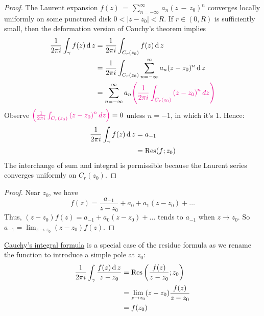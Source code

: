 \documentclass[12pt]{article}
\renewcommand{\d}{\ensuremath{\operatorname{d}}}
\begin{document}
\begin{proof}
    The Laurent expansion $f(z)\,=\,\sum_{n=-\infty}^{\infty}\,a_{n}(z\,-\,z_{0})^{n}$ converges locally uniformly on some punctured disk $0 < |z - z_0| < R$. If $r \in (0, R)$ is sufficiently small, then the deformation version of Cauchy's theorem implies \begin{align*}
        \frac{1}{2\pi i}\int_{\gamma}f(z)\d z&=\frac{1}{2\pi i}\int_{C_{r}(z_{0})}f(z)\d z\\
        &=\frac{1}{2\pi i}\int_{C_{r}(z_{0})}\sum_{n=-\infty}^{\infty}a_{n}(z-z_{0})^{n}\d z\\
        &= \sum_{n=-\infty}^{\infty}a_{n}\rt{\left(\frac{1}{2\pi i}\int_{C_{r}(z_{0})}^{}\left(z-z_{0}\right)^{n}d z\right)}
    \end{align*}
    Observe \(\textcolor{magenta}{\left(\frac{1}{2\pi i}\int_{C_{r}(z_{0})}^{}\left(z-z_{0}\right)^{n}d z\right)}=0\) unless $n=-1$, in which it's 1. Hence:
    \begin{align*}
        \frac{1}{2\pi i}\int_{\gamma}f(z)\d z&= a_{-1}\\
        &=\Res(f;z_0)
    \end{align*}
    The interchange of sum and integral is permissible because the Laurent series converges uniformly on $C_{r}(z_0)$.
\end{proof}

\begin{proof}
    Near $z_0$, we have \[f(z) = \frac{a_{-1}}{z-z_0}+a_0+a_1(z-z_0)+\dots\]
    Thus, $(z-z_0)f(z)=a_{-1}+a_0(z-z_0)+\dots$ tends to $a_{-1}$ when $z\to z_0$. So $a_{-1}=\lim_{z\to z_0}(z-z_0)f(z)$.
\end{proof}

\rmk \hyperlink{cauchys-integral-formula}{Cauchy's integral formula} is a special case of the residue formula as we rename the function to introduce a simple pole at $z_0$: \begin{align*}
    \frac{1}{2\pi i}\int_{\gamma}\frac{f(z)\d z}{z-z_0} &= \Res\left(\frac{f(z)}{z-z_0};z_0\right)\\
    &= \lim_{z\to z_0}(z-z_0)\frac{f(z)}{z-z_0}\\
    &=f(z_0)
\end{align*}
\end{document}
